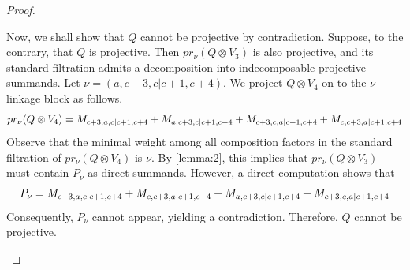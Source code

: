 \begin{proof}
\begin{enumerate}
\begin{enumerate}
Now, we shall show that $Q$ cannot be projective by contradiction.
Suppose, to the contrary, that $Q$ is projective. Then $pr_\nu(Q \otimes V_3)$ is also projective, and its standard filtration admits a decomposition into indecomposable projective summands.
Let $\nu = (a,c+3,c|c+1,c+4)$. We project $Q \otimes V_4$ on to the $\nu$ linkage block as follows.
\begin{equation}\notag
  \begin{aligned}
    pr_\nu(Q \otimes V_4) = 
M_{c+3,a,c|c+1,c+4}
+M_{a,c+3,c|c+1,c+4}
+M_{c+3,c,a|c+1,c+4}
+M_{c,c+3,a|c+1,c+4}
  \end{aligned}
\end{equation}
Observe that the minimal weight among all composition factors in the standard filtration of $pr_\nu(Q \otimes V_4)$ is $\nu$. By \cref{lemma:2}, this implies that $pr_\nu(Q \otimes V_3)$ must contain $P_\nu$ as direct summands. However, a direct computation shows that
  \begin{equation}\notag
    \begin{aligned}
  P_\nu =M_{c+3,a,c|c+1,c+4}
+M_{c,c+3,a|c+1,c+4}
+M_{a,c+3,c|c+1,c+4}
+M_{c+3,c,a|c+1,c+4}
    \end{aligned}
  \end{equation}
Consequently, $P_\nu$ cannot appear, yielding a contradiction. Therefore, $Q$ cannot be projective.



\end{enumerate}
\end{enumerate}
\end{proof}
